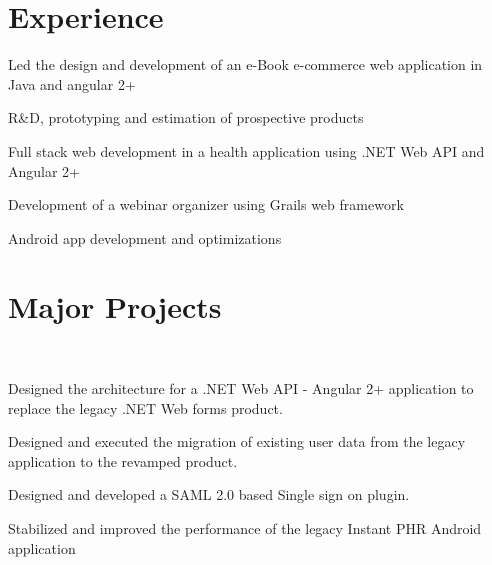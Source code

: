\documentclass[]{deedy-resume-openfont}
\begin{document}
\begin{minipage}[t]{0.66\textwidth} 


\section{Experience}

\vspace{\topsep} %
\begin{tightemize}
    \item Led the design and development of an e-Book e-commerce web application in Java and angular 2+
    \item R&D, prototyping and estimation of prospective products
    \item Full stack web development in a health application using .NET Web API and Angular 2+
    \item Development of a webinar organizer using Grails web framework 
    \item Android app development and optimizations
    
\end{tightemize}
\sectionsep


\section{Major Projects}

\\
\begin{tightemize} 
    \item Designed the architecture for a .NET Web API - Angular 2+ application to replace the legacy .NET Web forms product.
    \item Designed and executed the migration of existing user data from the legacy application to the revamped product.
    \item Designed and developed a SAML 2.0 based Single sign on plugin.
    \item Stabilized and improved the performance of the legacy Instant PHR Android application
\end{tightemize}
\sectionsep


\end{minipage}
\end{document}
